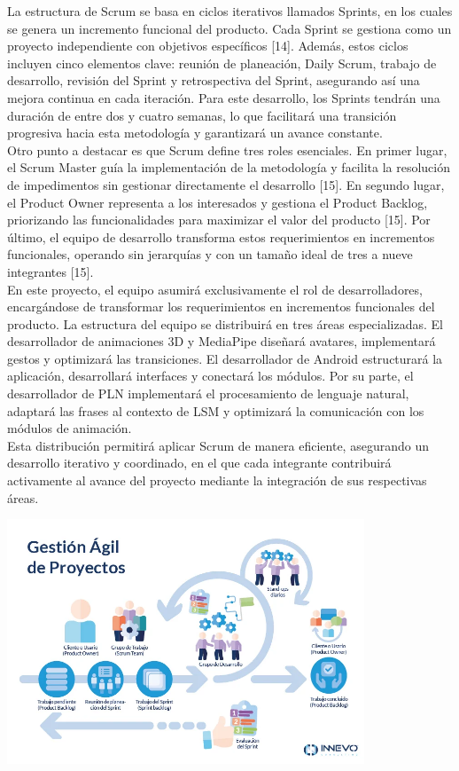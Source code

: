 La estructura de Scrum se basa en ciclos iterativos llamados Sprints, en los cuales se genera un incremento funcional del producto. Cada Sprint se gestiona como un proyecto independiente con objetivos específicos [14]. Además, estos ciclos incluyen cinco elementos clave: reunión de planeación, Daily Scrum, trabajo de desarrollo, revisión del Sprint y retrospectiva del Sprint, asegurando así una mejora continua en cada iteración. Para este desarrollo, los Sprints tendrán una duración de entre dos y cuatro semanas, lo que facilitará una transición progresiva hacia esta metodología y garantizará un avance constante.\\

Otro punto a destacar es que Scrum define tres roles esenciales. En primer lugar, el Scrum Master guía la implementación de la metodología y facilita la resolución de impedimentos sin gestionar directamente el desarrollo [15]. En segundo lugar, el Product Owner representa a los interesados y gestiona el Product Backlog, priorizando las funcionalidades para maximizar el valor del producto [15]. Por último, el equipo de desarrollo transforma estos requerimientos en incrementos funcionales, operando sin jerarquías y con un tamaño ideal de tres a nueve integrantes [15].\\

En este proyecto, el equipo asumirá exclusivamente el rol de desarrolladores, encargándose de transformar los requerimientos en incrementos funcionales del producto. La estructura del equipo se distribuirá en tres áreas especializadas. El desarrollador de animaciones 3D y MediaPipe diseñará avatares, implementará gestos y optimizará las transiciones. El desarrollador de Android estructurará la aplicación, desarrollará interfaces y conectará los módulos. Por su parte, el desarrollador de PLN implementará el procesamiento de lenguaje natural, adaptará las frases al contexto de LSM y optimizará la comunicación con los módulos de animación.\\

Esta distribución permitirá aplicar Scrum de manera eficiente, asegurando un desarrollo iterativo y coordinado, en el que cada integrante contribuirá activamente al avance del proyecto mediante la integración de sus respectivas áreas.


\begin{center}
    \includegraphics[width=0.8\textwidth]{Images/Cap 1/metoscrum.jpg}
\end{center}
